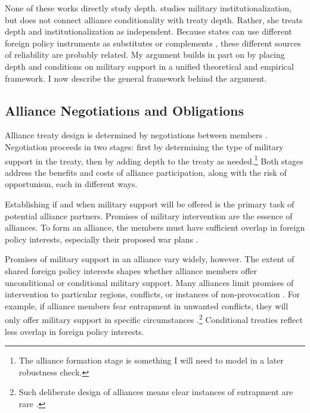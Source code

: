 \documentclass[12pt]{article}
\begin{document}
None of these works directly study depth. 
\citet{Mattes2012} studies military institutionalization, but does not connect alliance conditionality with treaty depth. 
Rather, she treats depth and institutionalization as independent. 
Because states can use different foreign policy instruments as substitutes or complements \citep{Starr2000, MorganPalmer2000}, these different sources of reliability are probably related. 
My argument builds in part on \citet{Mattes2012} by placing depth and conditions on military support in a unified theoretical and empirical framework. 
I now describe the general framework behind the argument. 


\subsection{Alliance Negotiations and Obligations}

Alliance treaty design is determined by negotiations between members \citep{Poast2019a}.  
Negotiation proceeds in two stages: first by determining the type of military support in the treaty, then by adding depth to the treaty as needed.\footnote{The alliance formation stage is something I will need to model in a later robustness check.}
Both stages address the benefits and costs of alliance participation, along with the risk of opportunism, each in different ways. 


Establishing if and when military support will be offered is the primary task of potential alliance partners. 
Promises of military intervention are the essence of alliances. 
To form an alliance, the members must have sufficient overlap in foreign policy interests, especially their proposed war plans \citep{Morrow1991, Smith1995, FordhamPoast2014, Poast2019a}.  


Promises of military support in an alliance vary widely, however. 
The extent of shared foreign policy interests shapes whether alliance members offer unconditional or conditional military support.
Many alliances limit promises of intervention to particular regions, conflicts, or instances of non-provocation \citep{Leedsetal2000}. 
For example, if alliance members fear entrapment in unwanted conflicts, they will only offer military support in specific circumstances \citep{Kim2011, Benson2012}.\footnote{Such deliberate design of alliances means clear instances of entrapment are rare \citep{Kim2011, Beckley2015}.} 
Conditional treaties reflect less overlap in foreign policy interests. 
\end{document}
